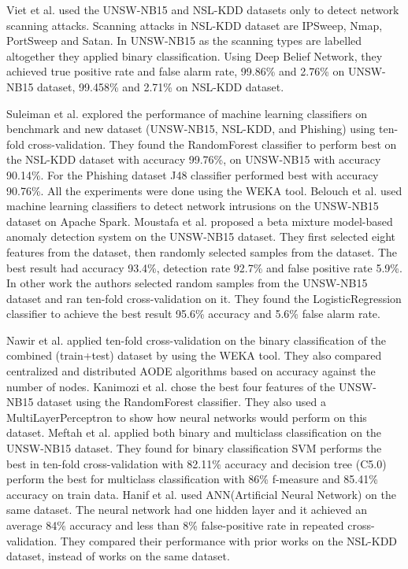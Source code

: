 \documentclass[14pt, conference]{IEEEtran}
\begin{document}
Viet et al. \cite{viet2018using} used the UNSW-NB15 and NSL-KDD datasets only to detect network scanning attacks.
Scanning attacks in NSL-KDD dataset are IPSweep, Nmap, PortSweep and Satan. In UNSW-NB15 as the scanning types are
labelled altogether they applied binary classification. Using Deep Belief Network, they achieved true positive rate
and false alarm rate, 99.86\% and 2.76\%  on UNSW-NB15 dataset, 99.458\% and 2.71\% on NSL-KDD dataset.

Suleiman et al. \cite{suleiman2018performance} explored the performance of machine learning classifiers on benchmark
and new dataset (UNSW-NB15, NSL-KDD, and Phishing) using ten-fold cross-validation. They found the RandomForest
classifier to perform best on the NSL-KDD dataset with accuracy 99.76\%, on UNSW-NB15 with accuracy 90.14\%. For
the Phishing dataset J48 classifier performed best with accuracy 90.76\%. All the experiments were done using the
WEKA tool. Belouch et al. \cite{belouch2018performance} used machine learning classifiers to detect network intrusions
on the UNSW-NB15 dataset on Apache Spark. Moustafa et al. \cite{moustafa2018anomaly} proposed a beta mixture
model-based anomaly detection system on the UNSW-NB15 dataset. They first selected eight features from the dataset,
then randomly selected samples from the dataset. The best result had accuracy 93.4\%, detection rate 92.7\% and
false positive rate 5.9\%. In other work \cite{moustafa2019holistic} the authors selected random samples from
the UNSW-NB15 dataset and ran ten-fold cross-validation on it. They found the LogisticRegression classifier to
achieve the best result 95.6\% accuracy and 5.6\% false alarm rate.

Nawir et al. \cite{nawir2019effective} applied ten-fold cross-validation on the binary classification of the combined
(train+test) dataset by using the WEKA tool. They also compared centralized and distributed AODE algorithms based on
accuracy against the number of nodes. Kanimozi et al. \cite{Kanimozhi2019UNSW-NB15} chose the best four features of
the UNSW-NB15 dataset using the RandomForest classifier. They also used a MultiLayerPerceptron to show how neural
networks would perform on this dataset.  Meftah et al. \cite{meftah2019network} applied both binary and multiclass
classification on the UNSW-NB15 dataset. They found for binary classification SVM performs the best in ten-fold
cross-validation with 82.11\% accuracy and decision tree (C5.0) perform the best for multiclass classification with
86\% f-measure and 85.41\% accuracy on train data. Hanif et al. \cite{hanif2019intrusion} used ANN(Artificial Neural Network)
on the same dataset. The neural network had one hidden layer and it achieved an average 84\% accuracy and less
than 8\% false-positive rate in repeated cross-validation. They compared their performance with prior works on the
NSL-KDD dataset, instead of works on the same dataset.
\end{document}
